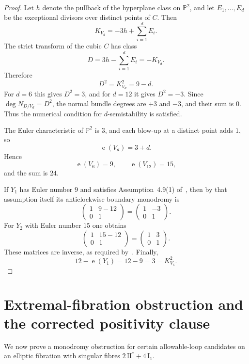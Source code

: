 \documentclass[12pt]{article}
\theoremstyle{plain}
\theoremstyle{definition}
\DeclareMathOperator{\eul}{e}
\newcommand{\bP}{\mathbb{P}}
\begin{document}
\begin{proof}
Let $h$ denote the pullback of the hyperplane class on $\bP^2$, and let $E_1,\dots,E_d$ be the exceptional divisors over distinct points of $C$.  Then
\[
K_{V_d} = -3h + \sum_{i=1}^d E_i.
\]
The strict transform of the cubic $C$ has class
\[
D = 3h - \sum_{i=1}^d E_i = -K_{V_d}.
\]
Therefore
\[
D^2 = K_{V_d}^2 = 9-d.
\]
For $d=6$ this gives $D^2=3$, and for $d=12$ it gives $D^2=-3$.  Since $\deg N_{D/V_d}=D^2$, the normal bundle degrees are $+3$ and $-3$, and their sum is $0$.  Thus the numerical condition for $d$-semistability is satisfied.

The Euler characteristic of $\bP^2$ is $3$, and each blow-up at a distinct point adds $1$, so
\[
\eul(V_d)=3+d.
\]
Hence
\[
\eul(V_6)=9,\qquad \eul(V_{12})=15,
\]
and the sum is $24$.

If $Y_1$ has Euler number $9$ and satisfies Assumption~4.9(1) of~\cite{GT24}, then by that assumption itself its anticlockwise boundary monodromy is
\[
\begin{pmatrix}
1 & 9-12\\
0 & 1
\end{pmatrix}
=
\begin{pmatrix}
1 & -3\\
0 & 1
\end{pmatrix}.
\]
For $Y_2$ with Euler number $15$ one obtains
\[
\begin{pmatrix}
1 & 15-12\\
0 & 1
\end{pmatrix}
=
\begin{pmatrix}
1 & 3\\
0 & 1
\end{pmatrix}.
\]
These matrices are inverse, as required by~\cite[Remark~4.12]{GT24}.  Finally,
\[
12-\eul(Y_1)=12-9=3=K_{V_6}^2.
\]
\end{proof}

\section{Extremal-fibration obstruction and the corrected positivity clause}

We now prove a monodromy obstruction for certain allowable-loop candidates on an elliptic fibration with singular fibres $2\,\mathrm{II}^*+4\,\mathrm{I}_1$.
\end{document}
